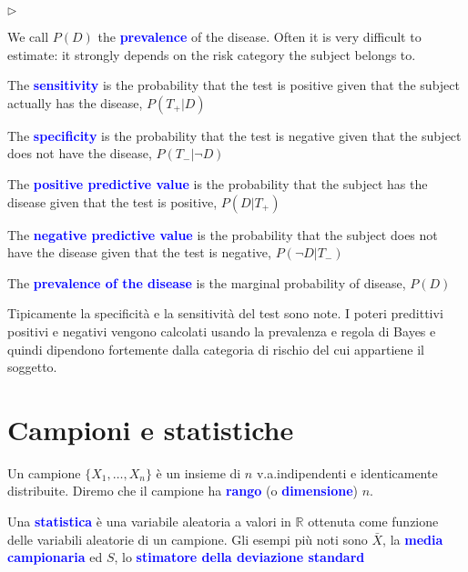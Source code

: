 \documentclass[10pt,openany]{book}
\def\RR{\mathds R}
\newcommand{\mylabel}[1]{{\footnotesize\textsf{#1}}\hfill}
\renewenvironment{itemize}
  {\begin{list}{$\triangleright$}{%
   \setlength{\parskip}{0mm}
   \setlength{\topsep}{.2\baselineskip}
   \setlength{\rightmargin}{0mm}
   \setlength{\listparindent}{0mm}
   \setlength{\itemindent}{0mm}
   \setlength{\labelwidth}{3ex}
   \setlength{\itemsep}{.4\baselineskip}
   \setlength{\parsep}{0mm}
   \setlength{\partopsep}{0mm}
   \setlength{\labelsep}{1ex}
   \setlength{\leftmargin}{\labelwidth+\labelsep}
   \let\makelabel\mylabel}}{%
   \end{list}\vspace*{-1.3mm}}
\def\emph#1{\textcolor{blue}{\textbf{\boldmath #1}}}
\theoremstyle{mio}
\theoremstyle{liscio}
\begin{document}
\begin{itemize}
\item We call $P(D)$ the \emph{prevalence\/} of the disease. Often it is very difficult to estimate: it strongly depends on the risk category the subject belongs to.
\item The \emph{sensitivity\/} is the probability that the test is
positive given that the subject actually has the disease, $P(T_+ | D)$
\item The \emph{specificity\/} is the probability that the test is
negative given that the subject does not have the disease, $P(T_- | \neg D)$
\item The \emph{positive predictive value\/} is the probability that the subject has the
disease given that the test is positive, $P(D | T_+)$
\item The \emph{negative predictive value\/} is the probability that the subject does not have
the disease given that the test is negative, $P(\neg D | T_-)$
\item The \emph{prevalence of the disease\/} is the marginal probability of disease, $P(D)$

\end{itemize}


Tipicamente la specificità e la sensitività del test sono note. I poteri predittivi positivi e negativi vengono calcolati usando la prevalenza e regola di Bayes e quindi dipendono fortemente dalla categoria di rischio del cui appartiene il soggetto.





\clearpage\section{Campioni e statistiche}

Un campione $\{X_1,\dots,X_n\}$ è un insieme di $n$ v.a.\@ indipendenti e identicamente distribuite. Diremo che il campione ha \emph{rango\/} (o \emph{dimensione\/}) $n$. 

Una \emph{statistica\/} è una variabile aleatoria a valori in $\RR$ ottenuta come funzione delle variabili aleatorie di un campione. Gli esempi più noti sono $\bar X$, la \emph{media campionaria\/} ed $S$, lo \emph{stimatore della deviazione standard\/} 

\ceq{\hfill \emph{$\bar X$}}{=}{\frac1n\sum_{i=1}^n X_i}

\ceq{\hfill  \emph{$S$}}{=}{\sqrt{\frac1{n-1}\sum_{i=1}^n (X_i-\bar X)^2}}
 
\end{document}
